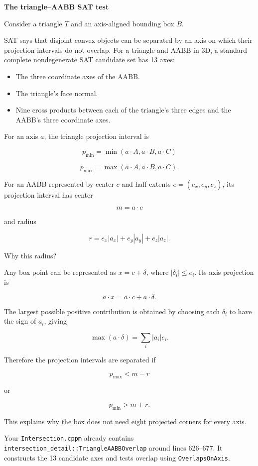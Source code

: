 \textbf{The triangle--AABB SAT test}

Consider a triangle \(T\) and an axis-aligned bounding box \(B\).

SAT says that disjoint convex objects can be separated by an axis on which their projection intervals do not overlap. For a triangle and AABB in 3D, a standard complete nondegenerate SAT candidate set has 13 axes:

\begin{itemize}
\tightlist
\item
  The three coordinate axes of the AABB.
\item
  The triangle's face normal.
\item
  Nine cross products between each of the triangle's three edges and the AABB's three coordinate axes.
\end{itemize}

For an axis \(a\), the triangle projection interval is

\[
p_{\min}=\min(a\cdot A,a\cdot B,a\cdot C)
\]

\[
p_{\max}=\max(a\cdot A,a\cdot B,a\cdot C).
\]

For an AABB represented by center \(c\) and half-extents \(e=(e_x,e_y,e_z)\), its projection interval has center

\[
m=a\cdot c
\]

and radius

\[
r=e_x|a_x|+e_y|a_y|+e_z|a_z|.
\]

Why this radius?

Any box point can be represented as \(x=c+\delta\), where \(|\delta_i|\le e_i\). Its axis projection is

\[
a\cdot x=a\cdot c+a\cdot\delta.
\]

The largest possible positive contribution is obtained by choosing each \(\delta_i\) to have the sign of \(a_i\), giving

\[
\max(a\cdot\delta)=\sum_i |a_i|e_i.
\]

Therefore the projection intervals are separated if

\[
p_{\max}<m-r
\]

or

\[
p_{\min}>m+r.
\]

This explains why the box does not need eight projected corners for every axis.

Your \texttt{Intersection.cppm} already contains \texttt{intersection\_detail::TriangleAABBOverlap} around lines 626--677. It constructs the 13 candidate axes and tests overlap using \texttt{OverlapsOnAxis}.

